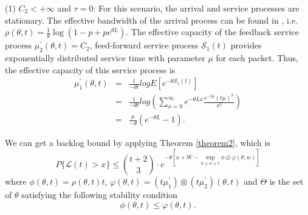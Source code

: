 \documentclass[12pt]{article}
\begin{document}
(1) $C_2<+\infty$ and $\tau= 0$: For this scenario, the arrival and service processes are stationary. The effective bandwidth of the arrival process can be found in \cite{Chan94}, i.e. $\rho(\theta,t)=\frac{1}{\theta}\log(1-p+pe^{\theta L})$. The effective capacity of the feedback service process $\mu_2^\prime(\theta,t)=C_2$, feed-forward service process $\mathcal{S}_1(t)$ provides exponentially distributed service time with parameter $\mu$ for each packet. Thus, the effective capacity of this service process is
\begin{eqnarray*}
\mu_1^\prime(\theta,t)&=& \frac{1}{-\theta t}log E[e^{-\theta \mathcal{S}_1(t)}]\\
&=& \frac{1}{-\theta t}log(\sum_{x=0}^\infty e^{-\theta Lx}\frac{e^{-t\mu}(t\mu)^x}{x!})\\
&=& \frac{\mu}{-\theta}(e^{-\theta L}-1).
\end{eqnarray*}

We can get a backlog bound by applying Theorem \ref{theorem2}, which is
\begin{equation}\label{bernoullibound}
P\{\mathcal{L}(t)>x\}\leq {t+2\choose 3}\cdot e^{-\theta [x+W-\sup_{0\leq w\leq t}\phi\oslash \varphi(\theta,w)]}
\end{equation}
where $\phi(\theta,t)=\rho(\theta,t)t$, $\varphi(\theta,t)=(t \mu_1^\prime)\otimes(t \mu_2^\prime)(\theta,t)$ and $\Theta$ is the set of $\theta$ satisfying the following stability condition
\begin{equation}\label{stabilitycond3}
\phi(\theta,t)\leq \varphi(\theta,t).
\end{equation}
\end{document}
